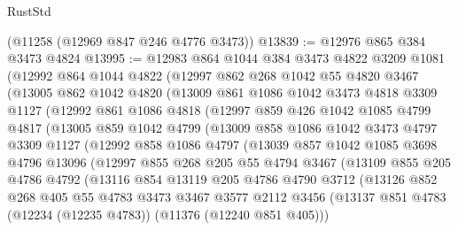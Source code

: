 \begin{lexlean}{RustStd}
\begin{coremodule}
{\begin{coremodule}
{{{{{{{{{{{{{{{{{{{{{{{{{{{{{{{{{{{{{{{{{{{{{{{{{{{{{{{{{{{{{{{{{{{{{{{{{{{{{{{{{{{{{    (@11258 (@12969 @847 @246 @4776 @3473))
@13839 := @12976 @865 @384 @3473 @4824
@13995 := @12983
    @864
    @1044
    @384
    @3473
    @4822
    @3209
    @1081
    (@12992
      @864
      @1044
      @4822
      (@12997
        @862
        @268
        @1042
        @55
        @4820
        @3467
        (@13005
          @862
          @1042
          @4820
          (@13009
            @861
            @1086
            @1042
            @3473
            @4818
            @3309
            @1127
            (@12992
              @861
              @1086
              @4818
              (@12997
                @859
                @426
                @1042
                @1085
                @4799
                @4817
                (@13005
                  @859
                  @1042
                  @4799
                  (@13009
                    @858
                    @1086
                    @1042
                    @3473
                    @4797
                    @3309
                    @1127
                    (@12992
                      @858
                      @1086
                      @4797
                      (@13039
                        @857
                        @1042
                        @1085
                        @3698
                        @4796
                        @13096
                        (@12997
                          @855
                          @268
                          @205
                          @55
                          @4794
                          @3467
                          (@13109
                            @855
                            @205
                            @4786
                            @4792
                            (@13116
                              @854
                              @13119
                              @205
                              @4786
                              @4790
                              @3712
                              (@13126
                                @852
                                @268
                                @405
                                @55
                                @4783
                                @3473
                                @3467
                                @3577
                                @2112
                                @3456
                                (@13137
                                  @851
                                  @4783
                                  (@12234 (@12235 @4783))
                                  (@11376 (@12240 @851 @405)))
}}}}}}}}}}}}}}}}}}}}}}}}}}}}}}}}}}}}}}}}}}}}}}}}}}}}}}}}}}}}}}}}}}}}}}}}}}}}}}}}}}}}}
\end{coremodule}}
\end{coremodule}
\end{lexlean}
